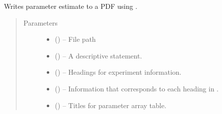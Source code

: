 \documentclass[letterpaper,10pt,english]{sphinxmanual}
\begin{document}
\begin{fulllineitems}
\label{\detokenize{references/write:nmrespy.write._write_pdf}}
\sphinxAtStartPar
Writes parameter estimate to a PDF using .
\begin{quote}\begin{description}
\item[{Parameters}] \leavevmode\begin{itemize}
\item {} 
\sphinxAtStartPar
{} () – File path

\item {} 
\sphinxAtStartPar
{} (\sphinxstyleliteralemphasis{\sphinxupquote{, }}) – A descriptive statement.

\item {} 
\sphinxAtStartPar
{} (\sphinxstyleliteralemphasis{\sphinxupquote{, }}) – Headings for experiment information.

\item {} 
\sphinxAtStartPar
{} (\sphinxstyleliteralemphasis{\sphinxupquote{, }}) – Information that corresponds to each heading in .

\item {} 
\sphinxAtStartPar
{} () – Titles for parameter array table.


\end{itemize}
\end{description}
\end{quote}
\end{fulllineitems}
\end{document}
